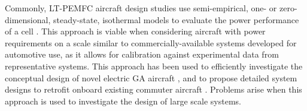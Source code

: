 Commonly, LT-PEMFC aircraft design studies use semi-empirical, one- or zero-dimensional, steady-state, isothermal  models to evaluate the power performance of a cell \cite{nicolayConceptualDesignOptimization2021b,  abukasimPerformanceFailureAnalysis2022a, ngHydrogenFuelCells2019a, parkRefinedSizingMethod2022, chiaramassaroOptimalDesignHydrogenpowered2024a, schmelcherHydrogenFuelCells2022a, sparanoFutureTechnologicalPotential2023a}.
This approach is viable when considering aircraft with power requirements on a scale similar to commercially-available systems developed for automotive use, as it allows for calibration against experimental data from representative systems.
This approach has been used to efficiently investigate the conceptual design of novel electric GA aircraft \cite{nicolayConceptualDesignOptimization2021b}, and to propose detailed system designs to retrofit onboard existing commuter aircraft \cite{abukasimPerformanceFailureAnalysis2022a}.
Problems arise when this approach is used to investigate the design of large scale systems.

